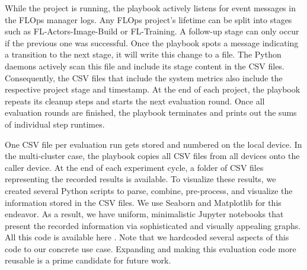 While the project is running, the playbook actively listens for event messages in the FLOps manager logs.
Any FLOps project's lifetime can be split into stages such as FL-Actors-Image-Build or FL-Training.
A follow-up stage can only occur if the previous one was successful.
Once the playbook spots a message indicating a transition to the next stage, it will write this change to a file.
The Python daemons actively scan this file and include its stage content in the CSV files.
Consequently, the CSV files that include the system metrics also include the respective project stage and timestamp.
At the end of each project, the playbook repeats its cleanup steps and starts the next evaluation round.
Once all evaluation rounds are finished, the playbook terminates and prints out the sums of individual step runtimes. 

One CSV file per evaluation run gets stored and numbered on the local device.
In the multi-cluster case, the playbook copies all CSV files from all devices onto the caller device.
At the end of each experiment cycle, a folder of CSV files representing the recorded results is available.
To visualize these results, we created several Python scripts to parse, combine, pre-process, and visualize the information stored in the CSV files.
We use Seaborn and Matplotlib for this endeavor.
As a result, we have uniform, minimalistic Jupyter notebooks that present the recorded information via sophisticated and visually appealing graphs.
All this code is available here \cite{cli_code}.
Note that we hardcoded several aspects of this code to our concrete use case.
Expanding and making this evaluation code more reusable is a prime candidate for future work.
